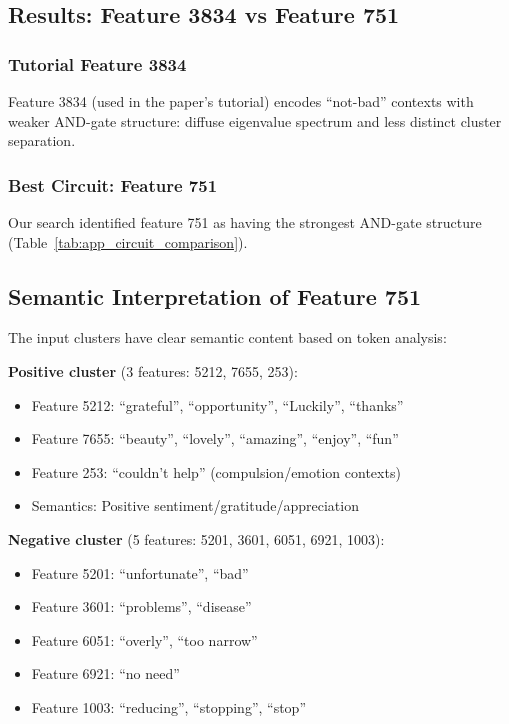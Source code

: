 \subsection{Results: Feature 3834 vs Feature 751}

\subsubsection{Tutorial Feature 3834}
Feature 3834 (used in the paper's tutorial) encodes ``not-bad'' contexts with weaker AND-gate structure:
diffuse eigenvalue spectrum and less distinct cluster separation.

\subsubsection{Best Circuit: Feature 751}
Our search identified feature 751 as having the strongest AND-gate structure (Table~\ref{tab:app_circuit_comparison}).

\subsection{Semantic Interpretation of Feature 751}

The input clusters have clear semantic content based on token analysis:

\textbf{Positive cluster} (3 features: 5212, 7655, 253):
\begin{itemize}
    \item Feature 5212: ``grateful'', ``opportunity'', ``Luckily'', ``thanks''
    \item Feature 7655: ``beauty'', ``lovely'', ``amazing'', ``enjoy'', ``fun''
    \item Feature 253: ``couldn't help'' (compulsion/emotion contexts)
    \item Semantics: Positive sentiment/gratitude/appreciation
\end{itemize}

\textbf{Negative cluster} (5 features: 5201, 3601, 6051, 6921, 1003):
\begin{itemize}
    \item Feature 5201: ``unfortunate'', ``bad''
    \item Feature 3601: ``problems'', ``disease''
    \item Feature 6051: ``overly'', ``too narrow''
    \item Feature 6921: ``no need''
    \item Feature 1003: ``reducing'', ``stopping'', ``stop''
\end{itemize}

